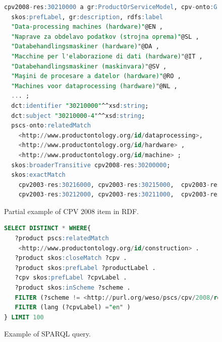 \begin{figure}[!ht]
\begin{lstlisting}[language=SQL,basicstyle=\ttfamily\scriptsize]  
cpv2008-res:30210000 a gr:ProductOrServiceModel, cpv-onto:Group;
  skos:prefLabel, gr:description, rdfs:label 	
  "Data-processing machines (hardware)"@EN ,
  "Naprave za obdelavo podatkov (strojna oprema)"@SL , 
  "Databehandlingsmaskiner (hardware)"@DA ,
  "Macchine per l'elaborazione di dati (hardware)"@IT ,
  "Databehandlingsmaskiner (maskinvara)"@SV ,
  "Maşini de procesare a datelor (hardware)"@RO ,   
  "Machines voor dataprocessing (hardware)"@NL , 
  ... ;
  dct:identifier "30210000"^^xsd:string;
  dct:subject "30210000-4"^^xsd:string;
  pscs-onto:relatedMatch   
    <http://www.productontology.org/id/dataprocessing>,
    <http://www.productontology.org/id/hardware> ,
    <http://www.productontology.org/id/machine> ;	
  skos:broaderTransitive cpv2008-res:30200000;
  skos:exactMatch 
    cpv2003-res:30216000, cpv2003-res:30215000,  cpv2003-res:30213000,   
    cpv2003-res:30212000, cpv2003-res:30211000,  cpv2003-res:30214000.
\end{lstlisting}
\caption{Partial example of CPV 2008 item in RDF.}
 \label{fig:example-cpv-code}
\end{figure}


\begin{figure}[!ht]
\begin{lstlisting}[language=SQL,basicstyle=\ttfamily\scriptsize]  
SELECT DISTINCT * WHERE{
   ?product pscs:relatedMatch 
    <http://www.productontology.org/id/construction> .
   ?product skos:closeMatch ?cpv .
   ?product skos:prefLabel ?productLabel .
   ?cpv skos:prefLabel ?cpvLabel .
   ?product skos:inScheme ?scheme .
   FILTER (?scheme != <http://purl.org/weso/pscs/cpv/2008/resource/ds>) .
   FILTER (lang (?cpvLabel) ="en" )
} LIMIT 100
\end{lstlisting}
\caption{Example of SPARQL query.}
 \label{fig:example-sparql-query}
\end{figure}

